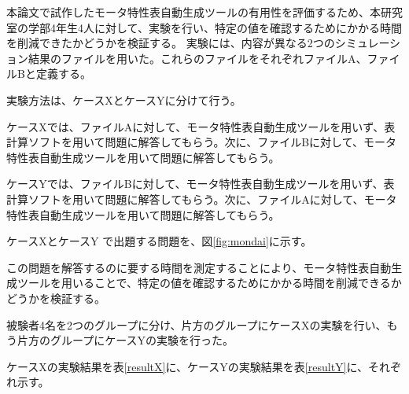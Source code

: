本論文で試作したモータ特性表自動生成ツールの有用性を評価するため、本研究室の学部4年生4人に対して、実験を行い、特定の値を確認するためにかかる時間を削減できたかどうかを検証する。
実験には、内容が異なる2つのシミュレーション結果のファイルを用いた。これらのファイルをそれぞれファイルA、ファイルBと定義する。

実験方法は、ケースXとケースYに分けて行う。

ケースXでは、ファイルAに対して、モータ特性表自動生成ツールを用いず、表計算ソフトを用いて問題に解答してもらう。次に、ファイルBに対して、モータ特性表自動生成ツールを用いて問題に解答してもらう。

ケースYでは、ファイルBに対して、モータ特性表自動生成ツールを用いず、表計算ソフトを用いて問題に解答してもらう。次に、ファイルAに対して、モータ特性表自動生成ツールを用いて問題に解答してもらう。

ケースXとケースY で出題する問題を、図\ref{fig:mondai}に示す。

この問題を解答するのに要する時間を測定することにより、モータ特性表自動生成ツールを用いることで、特定の値を確認するためにかかる時間を削減できるかどうかを検証する。

被験者4名を2つのグループに分け、片方のグループにケースXの実験を行い、もう片方のグループにケースYの実験を行った。

ケースXの実験結果を表\ref{resultX}に、ケースYの実験結果を表\ref{resultY}に、それぞれ示す。

